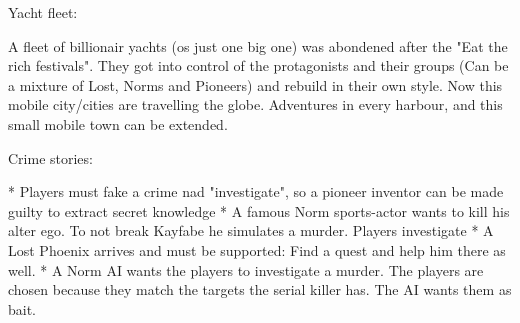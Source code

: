 Yacht fleet:

A fleet of billionair yachts (os just one big one) was abondened after the "Eat the rich festivals". They got into control of the protagonists and their groups (Can be a mixture of Lost, Norms and Pioneers) and rebuild in their own style. Now this mobile city/cities are travelling the globe. Adventures in every harbour, and this small mobile town can be extended.


Crime stories:

* Players must fake a crime nad "investigate", so a pioneer inventor can be made guilty to extract secret knowledge
* A famous Norm sports-actor wants to kill his alter ego. To not break Kayfabe he simulates a murder. Players investigate
* A Lost Phoenix arrives and must be supported: Find a quest and help him there as well.
* A Norm AI wants the players to investigate a murder. The players are chosen because they match the targets the serial killer has. The AI wants them as bait.